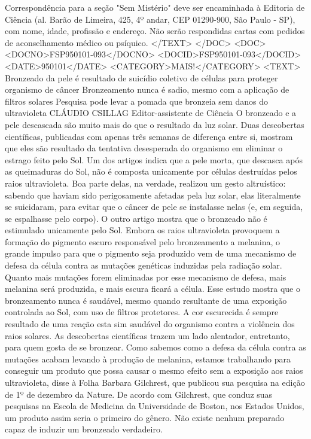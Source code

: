 Correspondência para a seção "Sem Mistério" deve ser encaminhada à Editoria de Ciência (al. Barão de Limeira, 425, 4º andar, CEP 01290-900, São Paulo - SP), com nome, idade, profissão e endereço. Não serão respondidas cartas com pedidos de aconselhamento médico ou psíquico.
</TEXT>
</DOC>
<DOC>
<DOCNO>FSP950101-093</DOCNO>
<DOCID>FSP950101-093</DOCID>
<DATE>950101</DATE>
<CATEGORY>MAIS!</CATEGORY>
<TEXT>
Bronzeado da pele é resultado de suicídio coletivo de células para proteger organismo de câncer 
Bronzeamento nunca é sadio, mesmo com a aplicação de filtros solares 
Pesquisa pode levar a pomada que bronzeia sem danos do ultravioleta 
CLÁUDIO CSILLAG 
Editor-assistente de Ciência 
O bronzeado e a pele descascada são muito mais do que o resultado da luz solar.
Duas descobertas científicas, publicadas com apenas três semanas de diferença entre si, mostram que eles são resultado da tentativa desesperada do organismo em eliminar o estrago feito pelo Sol.
Um dos artigos indica que a pele morta, que descasca após as queimaduras do Sol, não é composta unicamente por células destruídas pelos raios ultravioleta.
Boa parte delas, na verdade, realizou um gesto altruístico: sabendo que haviam sido perigosamente afetadas pela luz solar, elas literalmente se suicidaram, para evitar que o câncer de pele se instalasse nelas (e, em seguida, se espalhasse pelo corpo).
O outro artigo mostra que o bronzeado não é estimulado unicamente pelo Sol.
Embora os raios ultravioleta provoquem a formação do pigmento escuro responsável pelo bronzeamento a melanina, o grande impulso para que o pigmento seja produzido vem de uma mecanismo de defesa da célula contra as mutações genéticas induzidas pela radiação solar.
Quanto mais mutações forem eliminadas por esse mecanismo de defesa, mais melanina será produzida, e mais escura ficará a célula.
Esse estudo mostra que o bronzeamento nunca é saudável, mesmo quando resultante de uma exposição controlada ao Sol, com uso de filtros protetores.
A cor escurecida é sempre resultado de uma reação esta sim saudável do organismo contra a violência dos raios solares.
As descobertas científicas trazem um lado alentador, entretanto, para quem gosta de se bronzear.
 Como sabemos como a defesa da célula contra as mutações acabam levando à produção de melanina, estamos trabalhando para conseguir um produto que possa causar o mesmo efeito sem a exposição aos raios ultravioleta, disse à Folha Barbara Gilchrest, que publicou sua pesquisa na edição de 1º de dezembro da  Nature.
De acordo com Gilchrest, que conduz suas pesquisas na Escola de Medicina da Universidade de Boston, nos Estados Unidos, um produto assim seria o primeiro do gênero.  Não existe nenhum preparado capaz de induzir um bronzeado verdadeiro.
